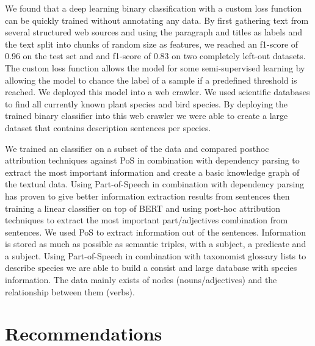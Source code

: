 \documentclass[a4paper, 12pt, oneside]{book} %
\begin{document}
We found that a deep learning binary classification with a custom loss function can be quickly trained without annotating any data.
By first gathering text from several structured web sources and using the paragraph and titles as labels and the text split into chunks of random size as features, we reached an f1-score of 0.96 on the test set and and f1-score of 0.83 on two completely left-out datasets.
The custom loss function allows the model for some semi-supervised learning by allowing the model to chance the label of a sample if a predefined threshold is reached.
We deployed this model into a web crawler.
We used scientific databases to find all currently known plant species and bird species.
By deploying the trained binary classifier into this web crawler we were able to create a large dataset that contains description sentences per species.

We trained an classifier on a subset of the data and compared posthoc attribution techniques against PoS in combination with dependency parsing to extract the most important information and create a basic knowledge graph of the textual data.
Using Part-of-Speech in combination with dependency parsing has proven to give better information extraction results from sentences then training a linear classifier on top of BERT and using post-hoc attribution techniques to extract the most important part/adjectives combination from sentences.
We used PoS to extract information out of the sentences.
Information is stored as much as possible as semantic triples, with a subject, a predicate and a subject.
Using Part-of-Speech in combination with taxonomist glossary lists to describe species we are able to build a consist and large database with species information.
The data mainly exists of nodes (nouns/adjectives) and the relationship between them (verbs).


\newpage
\section{Recommendations}
 
\end{document}
